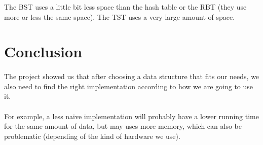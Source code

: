 \documentclass[a4paper]{article}
\begin{document}
The BST uses a little bit less space than the hash table or the RBT (they use
more or less the same space). The TST uses a very large amount of space.

\section{Conclusion}

    \paragraph{}The project showed us that after choosing a data structure that
fits our needs, we also need to find the right implementation according to how
we are going to use it.

    \paragraph{} For example, a less naive implementation will probably have a 
lower running time for the same amount of data, but may uses more memory, which 
can also be problematic (depending of the kind of hardware we use).
\end{document}
